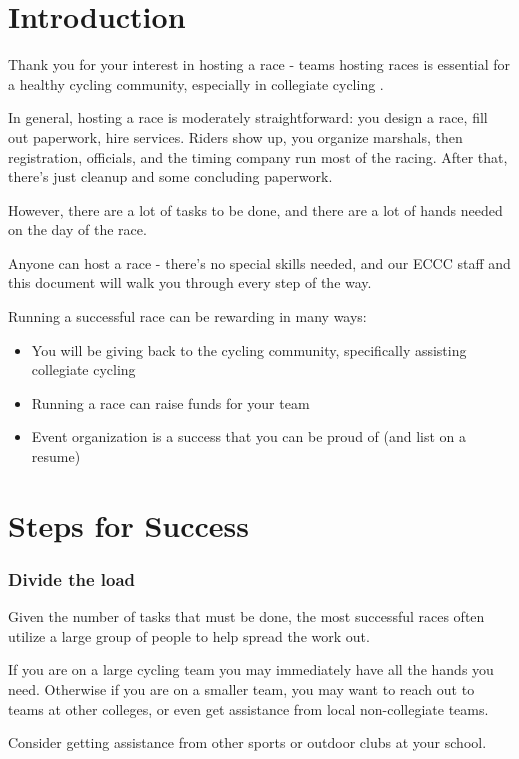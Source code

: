 \documentclass[
  letterpaper, %
  fontsize=10pt, %
  twoside=true,
  chapterentrydots=true, %
  numbers=noenddot,
  fontmethod=tex,
]{kaobook}
\begin{document}
\section{Introduction}

Thank you for your interest in hosting a race -
teams hosting races is essential for a healthy cycling community,
especially in collegiate cycling%
.

In general, hosting a race is moderately straightforward:
you design a race, fill out paperwork, hire services.
Riders show up, you organize marshals, then registration, officials,
and the timing company run most of the racing.
After that, there's just cleanup and some concluding paperwork.

However, there are a lot of tasks to be done,
and there are a lot of hands needed on the day of the race.

Anyone can host a race - there's no special skills needed,
and our ECCC staff and this document will walk you through every step of the way.

Running a successful race can be rewarding in many ways:
\begin{itemize}
  \item You will be giving back to the cycling community,
        specifically assisting collegiate cycling
  \item Running a race can raise funds for your team
  \item Event organization is a success that you can be proud of (and list on a resume)
\end{itemize}

\section{Steps for Success}

\subsubsection{Divide the load}
Given the number of tasks that must be done, the most successful races often
utilize a large group of people to help spread the work out.

If you are on a large cycling team you may immediately have all the hands you need.
Otherwise if you are on a smaller team, you may want to reach out to teams at other colleges, or even get assistance from local non-collegiate teams.

Consider getting assistance from other sports or outdoor clubs at your school.
\end{document}

